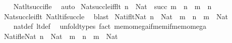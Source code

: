\begin{isabellebody}
%
\isadelimproof
\ \ %
\endisadelimproof
%
\isatagproof
{}\isamarkupfalse%
\ Nat{\isacharunderscore}{\kern0pt}lt{\isacharunderscore}{\kern0pt}succ{\isacharunderscore}{\kern0pt}if{\isacharunderscore}{\kern0pt}le\ \isamarkupfalse%
\ auto%
\endisatagproof
{\isafoldproof}%
%
\isadelimproof
\isanewline
%
\endisadelimproof
\isanewline
{}\isamarkupfalse%
\ Nat{\isacharunderscore}{\kern0pt}succ{\isacharunderscore}{\kern0pt}le{\isacharunderscore}{\kern0pt}iff{\isacharunderscore}{\kern0pt}lt{\isacharcolon}{\kern0pt}\ {\isachardoublequoteopen}n\ {\isacharcolon}{\kern0pt}\ Nat\ {\isasymLongrightarrow}\ succ\ m\ {\isasymle}\ n\ {\isasymlongleftrightarrow}\ m\ {\isacharless}{\kern0pt}\ n{\isachardoublequoteclose}\isanewline
%
\isadelimproof
\ \ %
\endisadelimproof
%
\isatagproof
{}\isamarkupfalse%
\ Nat{\isacharunderscore}{\kern0pt}succ{\isacharunderscore}{\kern0pt}le{\isacharunderscore}{\kern0pt}if{\isacharunderscore}{\kern0pt}lt\ Nat{\isacharunderscore}{\kern0pt}lt{\isacharunderscore}{\kern0pt}if{\isacharunderscore}{\kern0pt}succ{\isacharunderscore}{\kern0pt}le\ \isamarkupfalse%
\ blast%
\endisatagproof
{\isafoldproof}%
%
\isadelimproof
\isanewline
%
\endisadelimproof
\isanewline
\isanewline
{}\isamarkupfalse%
\ Nat{\isacharunderscore}{\kern0pt}if{\isacharunderscore}{\kern0pt}lt{\isacharunderscore}{\kern0pt}Nat{\isacharcolon}{\kern0pt}\ {\isachardoublequoteopen}n\ {\isacharcolon}{\kern0pt}\ Nat\ {\isasymLongrightarrow}\ m\ {\isacharless}{\kern0pt}\ n\ {\isasymLongrightarrow}\ m\ {\isacharcolon}{\kern0pt}\ Nat{\isachardoublequoteclose}\isanewline
\ \ \isanewline
\ \ \isanewline
%
\isadelimproof
\ \ %
\endisadelimproof
%
\isatagproof
{}\isamarkupfalse%
\ nat{\isacharunderscore}{\kern0pt}def\ lt{\isacharunderscore}{\kern0pt}def\ \isamarkupfalse%
\ unfold{\isacharunderscore}{\kern0pt}types\ {\isacharparenleft}{\kern0pt}fact\ mem{\isacharunderscore}{\kern0pt}omega{\isacharunderscore}{\kern0pt}if{\isacharunderscore}{\kern0pt}mem{\isacharunderscore}{\kern0pt}if{\isacharunderscore}{\kern0pt}mem{\isacharunderscore}{\kern0pt}omega{\isacharparenright}{\kern0pt}%
\endisatagproof
{\isafoldproof}%
%
\isadelimproof
\isanewline
%
\endisadelimproof
\isanewline
{}\isamarkupfalse%
\ Nat{\isacharunderscore}{\kern0pt}if{\isacharunderscore}{\kern0pt}le{\isacharunderscore}{\kern0pt}Nat{\isacharcolon}{\kern0pt}\ {\isachardoublequoteopen}n\ {\isacharcolon}{\kern0pt}\ Nat\ {\isasymLongrightarrow}\ m\ {\isasymle}\ n\ {\isasymLongrightarrow}\ m\ {\isacharcolon}{\kern0pt}\ Nat{\isachardoublequoteclose}\isanewline

\end{isabellebody}
